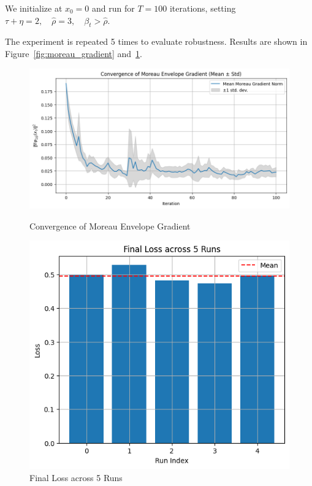 \documentclass{article}
\begin{document}
We initialize at \(x_0 = 0\) and run for \(T = 100\) iterations, setting
\(
\tau + \eta = 2, \quad \hat{\rho} = 3, \quad \beta_t > \hat{\rho}.
\)

The experiment is repeated 5 times to evaluate robustness. Results are shown in Figure~\ref{fig:moreau_gradient} and~\ref{fig:final_loss}.

\begin{figure}[h]
\centering
\begin{minipage}{0.55\textwidth}
\centering
\includegraphics[width=\textwidth]{moreau_gradient_convergence.png}
\caption{Convergence of Moreau Envelope Gradient}
\label{fig:moreau_gradient}
\end{minipage}
\hfill
\begin{minipage}{0.35\textwidth}
\centering
\includegraphics[width=\textwidth]{final_loss_comparison.png}
\caption{Final Loss across 5 Runs}
\label{fig:final_loss}
\end{minipage}
\end{figure}
\end{document}
